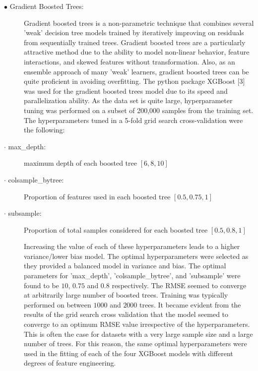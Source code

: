 \documentclass{article}
\begin{document}
\begin{description}
\item[\hspace{0.75cm}$\bullet$ Gradient Boosted Trees:] Gradient boosted trees is a non-parametric technique that combines several 'weak' decision tree models trained by iteratively improving on residuals from sequentially trained trees. Gradient boosted trees are a particularly attractive method due to the ability to model non-linear behavior, feature interactions, and skewed features without transformation. Also, as an ensemble approach of many 'weak' learners, gradient boosted trees can be quite proficient in avoiding overfitting. The python package XGBoost [3] was used for the gradient boosted trees model due to its speed and parallelization ability.
As the data set is quite large, hyperparameter tuning was performed on a subset of 200,000 samples from the training set. The hyperparameters tuned in a 5-fold grid search cross-validation were the following:

\item[\hspace{1.5cm}$\cdot$ max\_depth:] maximum depth of each boosted tree $[6,8,10]$
\item[\hspace{1.5cm}$\cdot$ colsample\_bytree:] Proportion of features used in each boosted tree $[0.5,0.75,1]$
\item[\hspace{1.5cm}$\cdot$ subsample:] Proportion of total samples considered for each boosted tree $[0.5,0.8,1]$

Increasing the value of each of these hyperparameters leads to a higher variance/lower bias model. The optimal hyperparameters were selected as they provided a balanced model in variance and bias. The optimal parameters for 'max\_depth', 'colsample\_bytree', and 'subsample' were found to be $10$, $0.75$ and $0.8$ respectively. The RMSE seemed to converge at arbitrarily large number of boosted trees. Training was typically performed on between $1000$ and $2000$ trees. It became evident from the results of the grid search cross validation that the model seemed to converge to an optimum RMSE value irrespective of the hyperparameters. This is often the case for datasets with a very large sample size and a large number of trees. For this reason, the same optimal hyperparameters were used in the fitting of each of the four XGBoost models with different degrees of feature engineering.


\end{description}
\end{document}
